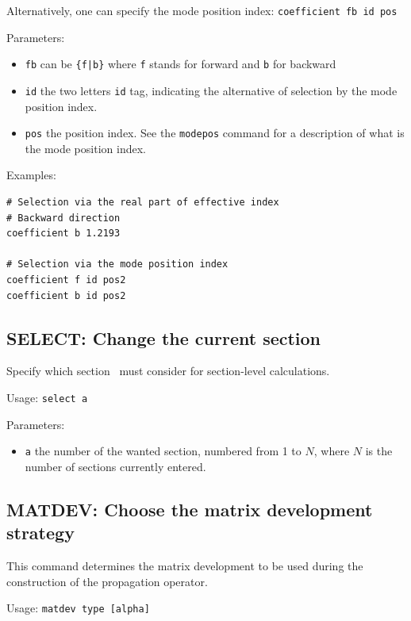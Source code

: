     Alternatively, one can specify the mode position index: \lstinline!coefficient fb id pos!
    
    Parameters:
    \begin{itemize}
    \item\lstinline!fb! can be \lstinline!{f|b}! where \lstinline!f! stands for forward and \lstinline!b! for backward
    \item\lstinline!id!  the two letters \lstinline!id! tag, indicating the alternative of selection by the mode position index.
    \item\lstinline!pos! the position index. See the \lstinline!modepos! command for a description of what is the mode position index.
    \end{itemize}
    
    Examples:

\begin{lstlisting}  
# Selection via the real part of effective index
# Backward direction
coefficient b 1.2193

# Selection via the mode position index
coefficient f id pos2
coefficient b id pos2
\end{lstlisting}
 
\subsection{SELECT: Change the current section}
\label{subsec_select}
    Specify which section \afmm\ must consider for section-level calculations.

    Usage: \lstinline!select a!
    
    Parameters:
    \begin{itemize}
    \item\lstinline!a!  the number of the wanted section, numbered from 1 to $N$, where $N$ is the number of sections currently entered.
    \end{itemize}

\subsection{MATDEV: Choose the matrix development strategy}
\label{subsec_matdev}
    This command determines the matrix development to be used during the construction of the propagation operator.

    Usage: \lstinline!matdev type [alpha]! 
    
